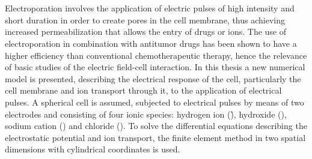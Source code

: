 \chapter*{\runtitle}

\noindent 
Electroporation involves the application of electric pulses of high intensity and short duration in order to create pores in the cell membrane, thus achieving increased permeabilization that allows the entry of drugs or ions.
The use of electroporation in combination with antitumor drugs has been shown to have a higher efficiency than conventional chemotherapeutic therapy, hence the relevance of basic studies of the electric field-cell interaction.
In this thesis a new numerical model is presented, describing the electrical response of the cell, particularly the cell membrane and ion transport through it, to the application of electrical pulses.
A spherical cell is assumed, subjected to electrical pulses by means of two electrodes and consisting of four ionic species: hydrogen ion (\h), hydroxide (\oh), sodium cation (\na) and chloride (\cl).
To solve the differential equations describing the electrostatic potential and ion transport, the finite element method in two spatial dimensions with cylindrical coordinates is used.
